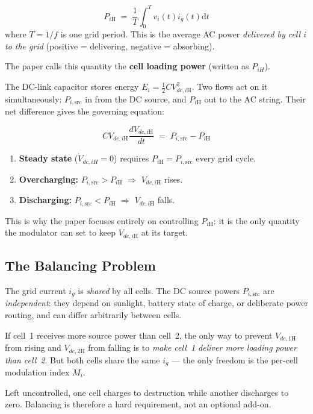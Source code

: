\documentclass[12pt, a4paper]{article}
\def\,{ }%
\newcommand{\ig}{i_{g}}
\newcommand{\Vdci}[1]{V_{dc,#1\mathrm{H}}}
\newcommand{\Mi}{M_{i}}
\newcommand{\PHi}[1]{P_{#1\mathrm{H}}}
\begin{document}
\begin{eqnbox}
\[
    \PHi{i} \;=\; \frac{1}{T}\int_{0}^{T} v_i(t)\,\ig(t)\,\mathrm{d}t
\]
where $T = 1/f$ is one grid period.
This is the average AC power \emph{delivered by cell $i$ to the grid}
(positive = delivering, negative = absorbing).
\end{eqnbox}

The paper calls this quantity the \textbf{cell loading power} (written as $P_{iH}$).

The DC-link capacitor stores energy $E_i = \tfrac{1}{2}C\Vdci{i}^2$.
Two flows act on it simultaneously: $P_{i,\mathrm{src}}$ in from the DC
source, and $\PHi{i}$ out to the AC string.
Their net difference gives the governing equation:

\begin{eqnbox}
\[
    C\,\Vdci{i}\,\frac{d\Vdci{i}}{dt}
    \;=\; P_{i,\mathrm{src}} - \PHi{i}
\]
\end{eqnbox}

\begin{physbox}
\begin{enumerate}
    \item \textbf{Steady state} ($\dot{V}_{dc,iH} = 0$) requires
          $\PHi{i} = P_{i,\mathrm{src}}$ every grid cycle.
    \item \textbf{Overcharging:} $P_{i,\mathrm{src}} > \PHi{i}$
          $\Rightarrow$ $\Vdci{i}$ rises.
    \item \textbf{Discharging:} $P_{i,\mathrm{src}} < \PHi{i}$
          $\Rightarrow$ $\Vdci{i}$ falls.
\end{enumerate}
This is why the paper focuses entirely on controlling $\PHi{i}$:
it is the only quantity the modulator can set to keep $\Vdci{i}$
at its target.
\end{physbox}

\subsection{The Balancing Problem}
\label{subsec:problem}

\begin{warningbox}
The grid current $\ig$ is \emph{shared} by all cells.
The DC source powers $P_{i,\mathrm{src}}$ are \emph{independent}:
they depend on sunlight, battery state of charge, or deliberate power
routing, and can differ arbitrarily between cells.

If cell~1 receives more source power than cell~2, the only way to
prevent $\Vdci{1}$ from rising and $\Vdci{2}$ from falling is to
\emph{make cell~1 deliver more loading power than cell~2}.
But both cells share the same $\ig$ --- the only freedom is the
per-cell modulation index $\Mi$.

Left uncontrolled, one cell charges to destruction while another
discharges to zero. Balancing is therefore a hard requirement, not
an optional add-on.
\end{warningbox}
\end{document}
